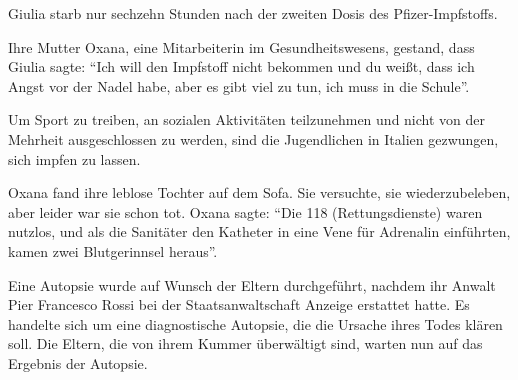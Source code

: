 Giulia starb nur sechzehn Stunden nach der zweiten Dosis des Pfizer-Impfstoffs.

Ihre Mutter Oxana, eine Mitarbeiterin im Gesundheitswesens, gestand, dass Giulia
sagte: ``Ich will den Impfstoff nicht bekommen und du weißt, dass ich Angst vor
der Nadel habe, aber es gibt viel zu tun, ich muss in die Schule''.

Um Sport zu treiben, an sozialen Aktivitäten teilzunehmen und nicht von der
Mehrheit ausgeschlossen zu werden, sind die Jugendlichen in Italien gezwungen,
sich impfen zu lassen.

Oxana fand ihre leblose Tochter auf dem Sofa. Sie versuchte, sie
wiederzubeleben, aber leider war sie schon tot. Oxana sagte: ``Die 118
(Rettungsdienste) waren nutzlos, und als die Sanitäter den Katheter in eine Vene
für Adrenalin einführten, kamen zwei Blutgerinnsel heraus''.

Eine Autopsie wurde auf Wunsch der Eltern durchgeführt, nachdem ihr Anwalt Pier
Francesco Rossi bei der Staatsanwaltschaft Anzeige erstattet hatte. Es handelte
sich um eine diagnostische Autopsie, die die Ursache ihres Todes klären
soll. Die Eltern, die von ihrem Kummer überwältigt sind, warten nun auf das
Ergebnis der Autopsie.
